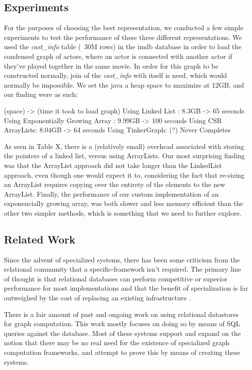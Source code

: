 \documentclass[11pt,letterpaper]{article}
\begin{document}
\subsection*{Experiments}
For the purposes of choosing the best representation, we conducted a few simple experiments to test the performance of these three different representations. We used the \textit{cast\_info} table (~30M rows) in the imdb database in order to load the condensed graph of actors, where an actor is connected with another actor if they've played together in the same movie. In order for this graph to be constructed normally, join of the \textit{cast\_info} with itself is need, which would normally be impossible. We set the java a heap space to maximize at 12GB, and our finding were as such:

 (space) -> (time it took to load graph)
Using Linked List : 8.3GB -> 65 seconds
Using Exponentially Growing Array : 9.99GB -> 100 seconds
Using CSR ArrayLists: 8.04GB -> 64 seconds
Using TinkerGraph: (?) Never Completes

As seen in Table X, there is a (relatively small) overhead  associated with storing the pointers of a linked list, versus using ArrayLists. Our most surprising finding was that the ArrayList approach did not take longer than the LinkedList approach, even though one would expect it to, considering the fact that re-sizing an ArrayList requires copying over the entirety of the elements to the new ArrayList. Finally, the performance of our custom implementation of an exponencially growing array, was both slower and less memory efficient than the other two simpler methods, which is something that we need to further explore.

\subsection*{Related Work}

Since the advent of specialized systems, there has been some criticism from the relational community that a specific-framework isn't required. The primary line of thought is that relational databases can perform competitive or superior performance for most implementations and that the benefit of specialization is far outweighed by the cost of replacing an existing infrastructure \cite{welc_graph_2013}.

There is a fair amount of past and ongoing work on using relational datastores for graph computation. This work mostly focuses on doing so by means of SQL queries against the database. Most of these systems support and expand on the notion that there may be no real need for the existence of specialized graph computation frameworks, and attempt to prove this by means of creating these systems.
\end{document}
